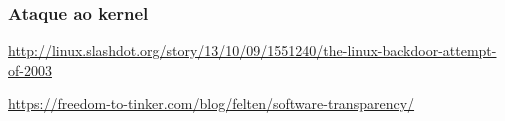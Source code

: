 \begin{frame}[fragile]\frametitle{Ataque ao kernel}

\url{http://linux.slashdot.org/story/13/10/09/1551240/the-linux-backdoor-attempt-of-2003}

\url{https://freedom-to-tinker.com/blog/felten/software-transparency/}

\end{frame}
